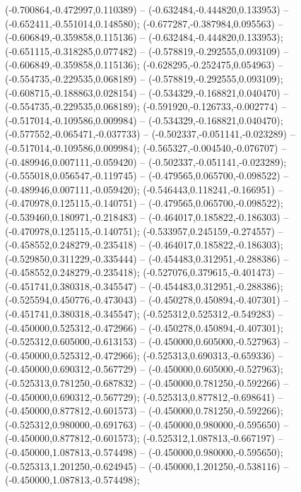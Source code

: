  (-0.700864,-0.472997,0.110389) -- (-0.632484,-0.444820,0.133953) -- (-0.652411,-0.551014,0.148580);
 (-0.677287,-0.387984,0.095563) -- (-0.606849,-0.359858,0.115136) -- (-0.632484,-0.444820,0.133953);
 (-0.651115,-0.318285,0.077482) -- (-0.578819,-0.292555,0.093109) -- (-0.606849,-0.359858,0.115136);
 (-0.628295,-0.252475,0.054963) -- (-0.554735,-0.229535,0.068189) -- (-0.578819,-0.292555,0.093109);
 (-0.608715,-0.188863,0.028154) -- (-0.534329,-0.168821,0.040470) -- (-0.554735,-0.229535,0.068189);
 (-0.591920,-0.126733,-0.002774) -- (-0.517014,-0.109586,0.009984) -- (-0.534329,-0.168821,0.040470);
 (-0.577552,-0.065471,-0.037733) -- (-0.502337,-0.051141,-0.023289) -- (-0.517014,-0.109586,0.009984);
 (-0.565327,-0.004540,-0.076707) -- (-0.489946,0.007111,-0.059420) -- (-0.502337,-0.051141,-0.023289);
 (-0.555018,0.056547,-0.119745) -- (-0.479565,0.065700,-0.098522) -- (-0.489946,0.007111,-0.059420);
 (-0.546443,0.118241,-0.166951) -- (-0.470978,0.125115,-0.140751) -- (-0.479565,0.065700,-0.098522);
 (-0.539460,0.180971,-0.218483) -- (-0.464017,0.185822,-0.186303) -- (-0.470978,0.125115,-0.140751);
 (-0.533957,0.245159,-0.274557) -- (-0.458552,0.248279,-0.235418) -- (-0.464017,0.185822,-0.186303);
 (-0.529850,0.311229,-0.335444) -- (-0.454483,0.312951,-0.288386) -- (-0.458552,0.248279,-0.235418);
 (-0.527076,0.379615,-0.401473) -- (-0.451741,0.380318,-0.345547) -- (-0.454483,0.312951,-0.288386);
 (-0.525594,0.450776,-0.473043) -- (-0.450278,0.450894,-0.407301) -- (-0.451741,0.380318,-0.345547);
 (-0.525312,0.525312,-0.549283) -- (-0.450000,0.525312,-0.472966) -- (-0.450278,0.450894,-0.407301);
 (-0.525312,0.605000,-0.613153) -- (-0.450000,0.605000,-0.527963) -- (-0.450000,0.525312,-0.472966);
 (-0.525313,0.690313,-0.659336) -- (-0.450000,0.690312,-0.567729) -- (-0.450000,0.605000,-0.527963);
 (-0.525313,0.781250,-0.687832) -- (-0.450000,0.781250,-0.592266) -- (-0.450000,0.690312,-0.567729);
 (-0.525313,0.877812,-0.698641) -- (-0.450000,0.877812,-0.601573) -- (-0.450000,0.781250,-0.592266);
 (-0.525312,0.980000,-0.691763) -- (-0.450000,0.980000,-0.595650) -- (-0.450000,0.877812,-0.601573);
 (-0.525312,1.087813,-0.667197) -- (-0.450000,1.087813,-0.574498) -- (-0.450000,0.980000,-0.595650);
 (-0.525313,1.201250,-0.624945) -- (-0.450000,1.201250,-0.538116) -- (-0.450000,1.087813,-0.574498);
